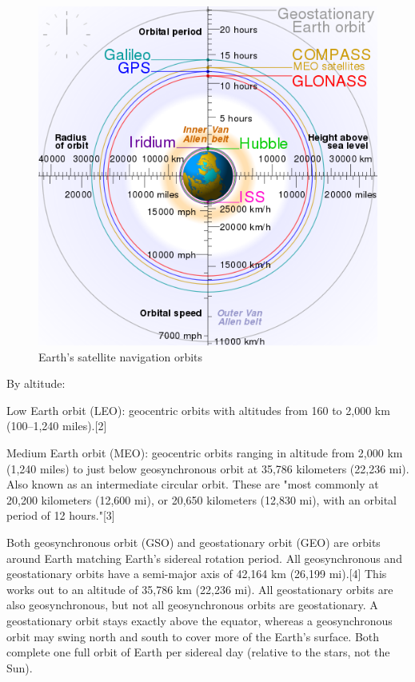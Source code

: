 \documentclass[12pt,a4paper,oneside]{article}
\begin{document}
\begin{figure}[ht]
\includegraphics[scale=0.7]{Comparison_satellite_navigation_orbits.png}
\centering
\caption{Earth's satellite navigation orbits \cite{orbits-image}}
\label{fig:orbits-image}
\end{figure}
By altitude:

Low Earth orbit (LEO): geocentric orbits with altitudes from 160 to 2,000 km (100–1,240 miles).[2]

Medium Earth orbit (MEO): geocentric orbits ranging in altitude from 2,000 km (1,240 miles) to just below geosynchronous orbit at 35,786 kilometers (22,236 mi). Also known as an intermediate circular orbit. These are "most commonly at 20,200 kilometers (12,600 mi), or 20,650 kilometers (12,830 mi), with an orbital period of 12 hours."[3]

Both geosynchronous orbit (GSO) and geostationary orbit (GEO) are orbits around Earth matching Earth's sidereal rotation period. All geosynchronous and geostationary orbits have a semi-major axis of 42,164 km (26,199 mi).[4] This works out to an altitude of 35,786 km (22,236 mi). All geostationary orbits are also geosynchronous, but not all geosynchronous orbits are geostationary. A geostationary orbit stays exactly above the equator, whereas a geosynchronous orbit may swing north and south to cover more of the Earth's surface. Both complete one full orbit of Earth per sidereal day (relative to the stars, not the Sun).
\end{document}
